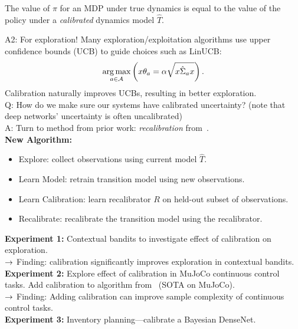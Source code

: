 \begin{theorem}
The value of $\pi$ for an MDP under true dynamics is equal to the value of the policy under a {\it calibrated} dynamics model $\widehat{T}$.
\end{theorem}

A2: For exploration! Many exploration/exploitation algorithms use upper confidence bounds (UCB) to guide choices such as LinUCB:
\[
\operatorname*{arg\,max}_{a \in \mathcal{A}}\left(x \theta_a = \alpha \sqrt{x \hat{\Sigma}_a x}\right).
\]
Calibration naturally improves UCBs, resulting in better exploration. \\

Q: How do we make sure our systems have calibrated uncertainty? (note that deep networks' uncertainty is often uncalibrated) \\

A: Turn to method from prior work: {\it recalibration} from~\citet{kuleshov2018accurate}. \\

{\bf New Algorithm:}
\begin{itemize}
    \item Explore: collect observations using current model $\widehat{T}$.
    \item Learn Model: retrain transition model using new observations.
    \item Learn Calibration: learn recalibrator $R$ on held-out subset of observations.
    \item Recalibrate: recalibrate the transition model using the recalibrator.
\end{itemize}

{\bf Experiment 1:} Contextual bandits to investigate effect of calibration on exploration. \\

$\rightarrow$ Finding: calibration significantly improves exploration in contextual bandits. \\

{\bf Experiment 2:} Explore effect of calibration in MuJoCo continuous control tasks. Add calibration to algorithm from~\citet{chua2018deep} (SOTA on MuJoCo). \\

$\rightarrow$ Finding: Adding calibration can improve sample complexity of continuous control tasks. \\

{\bf Experiment 3:} Inventory planning---calibrate a Bayesian DenseNet.


\spacerule

